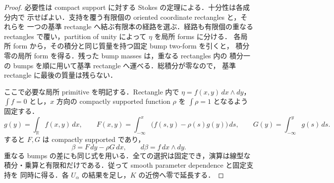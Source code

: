 \begin{proof}
必要性は compact support に対する Stokes の定理による．十分性は各成分内で
示せばよい．支持を覆う有限個の oriented coordinate rectangles と，それらを
一つの基準 rectangle へ結ぶ有限本の経路を選ぶ．経路も有限個の重なる rectangles
で覆い，partition of unity によって $\eta$ を局所 forms に分ける．
各局所 form から，その積分と同じ質量を持つ固定 bump two-form を引くと，
積分零の局所 form を得る．残った bump masses は，重なる rectangles 内の
積分一の bumps を順に用いて基準 rectangle へ運べる．総積分が零なので，
基準 rectangle に最後の質量は残らない．

ここで必要な局所 primitive を明記する．Rectangle 内で
$\eta=f(x,y)\,dx\wedge dy$，$\int f=0$ とし，$x$ 方向の compactly supported
function $\rho$ を $\int\rho=1$ となるよう固定する．
\[
 g(y)=\int_{\mathbb R} f(x,y)\,dx,\qquad
 F(x,y)=\int_{-\infty}^{x}\bigl(f(s,y)-\rho(s)g(y)\bigr)\,ds,
 \qquad
 G(y)=\int_{-\infty}^{y}g(s)\,ds.
\]
すると $F,G$ は compactly supported であり，
\[
 \beta=F\,dy-\rho G\,dx,
 \qquad d\beta=f\,dx\wedge dy.
\]
重なる bumps の差にも同じ式を用いる．全ての選択は固定でき，演算は線型な
積分・乗算と有限和だけである．従って smooth parameter dependence と固定支持を
同時に得る．各 $U_\alpha$ の結果を足し，$K$ の近傍へ零で延長する．
\end{proof}

